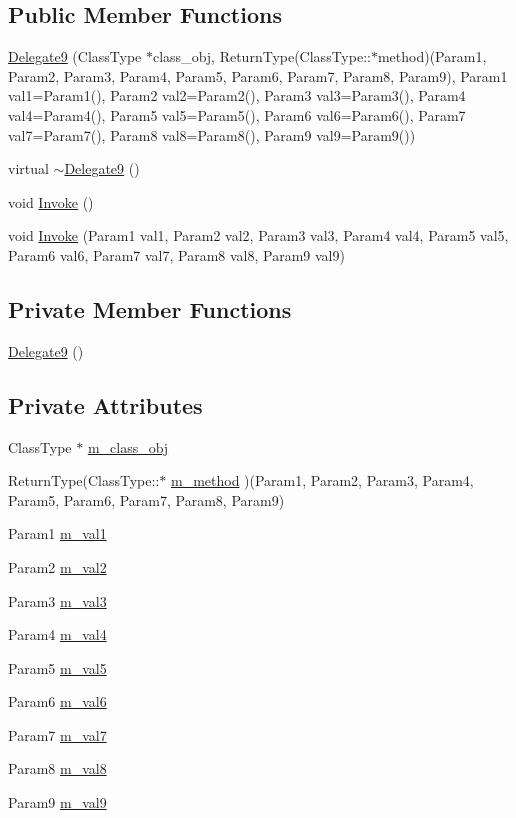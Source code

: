 \subsection*{Public Member Functions}
\begin{CompactItemize}
\item 
\hyperlink{classDL_1_1Delegate9_a0}{Delegate9} (Class\-Type $\ast$class\_\-obj, Return\-Type(Class\-Type::$\ast$method)(Param1, Param2, Param3, Param4, Param5, Param6, Param7, Param8, Param9), Param1 val1=Param1(), Param2 val2=Param2(), Param3 val3=Param3(), Param4 val4=Param4(), Param5 val5=Param5(), Param6 val6=Param6(), Param7 val7=Param7(), Param8 val8=Param8(), Param9 val9=Param9())
\item 
virtual \hyperlink{classDL_1_1Delegate9_a1}{$\sim$Delegate9} ()
\item 
void \hyperlink{classDL_1_1Delegate9_a2}{Invoke} ()
\item 
void \hyperlink{classDL_1_1Delegate9_a3}{Invoke} (Param1 val1, Param2 val2, Param3 val3, Param4 val4, Param5 val5, Param6 val6, Param7 val7, Param8 val8, Param9 val9)
\end{CompactItemize}
\subsection*{Private Member Functions}
\begin{CompactItemize}
\item 
\hyperlink{classDL_1_1Delegate9_d0}{Delegate9} ()
\end{CompactItemize}
\subsection*{Private Attributes}
\begin{CompactItemize}
\item 
Class\-Type $\ast$ \hyperlink{classDL_1_1Delegate9_r0}{m\_\-class\_\-obj}
\item 
Return\-Type(Class\-Type::$\ast$ \hyperlink{classDL_1_1Delegate9_r1}{m\_\-method} )(Param1, Param2, Param3, Param4, Param5, Param6, Param7, Param8, Param9)
\item 
Param1 \hyperlink{classDL_1_1Delegate9_r2}{m\_\-val1}
\item 
Param2 \hyperlink{classDL_1_1Delegate9_r3}{m\_\-val2}
\item 
Param3 \hyperlink{classDL_1_1Delegate9_r4}{m\_\-val3}
\item 
Param4 \hyperlink{classDL_1_1Delegate9_r5}{m\_\-val4}
\item 
Param5 \hyperlink{classDL_1_1Delegate9_r6}{m\_\-val5}
\item 
Param6 \hyperlink{classDL_1_1Delegate9_r7}{m\_\-val6}
\item 
Param7 \hyperlink{classDL_1_1Delegate9_r8}{m\_\-val7}
\item 
Param8 \hyperlink{classDL_1_1Delegate9_r9}{m\_\-val8}
\item 
Param9 \hyperlink{classDL_1_1Delegate9_r10}{m\_\-val9}
\end{CompactItemize}


